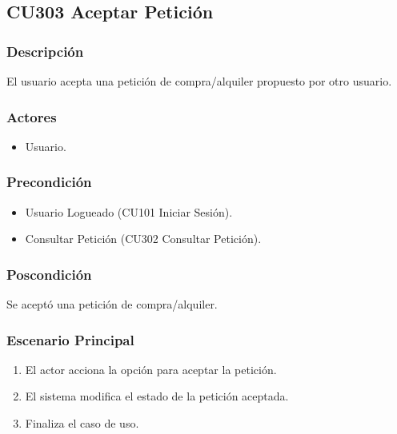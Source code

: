 \subsection{CU303 Aceptar Petici\'{o}n}
\subsubsection{Descripci\'{o}n}
El usuario acepta una petici\'{o}n de compra/alquiler propuesto por otro usuario.
\subsubsection{Actores}
\begin{itemize}
\item Usuario.
\end{itemize}
\subsubsection{Precondici\'{o}n}
\begin{itemize}
\item Usuario Logueado (CU101 Iniciar Sesi\'{o}n).
\item Consultar Petici\'{o}n (CU302 Consultar Petici\'{o}n).
\end{itemize}
\subsubsection{Poscondici\'{o}n}
Se acept\'{o} una petici\'{o}n de compra/alquiler.
\subsubsection{Escenario Principal}
\begin{enumerate}
\item El actor acciona la opci\'{o}n para aceptar la petici\'{o}n.
\item El sistema modifica el estado de la petici\'{o}n aceptada.
\item Finaliza el caso de uso.
\end{enumerate}
